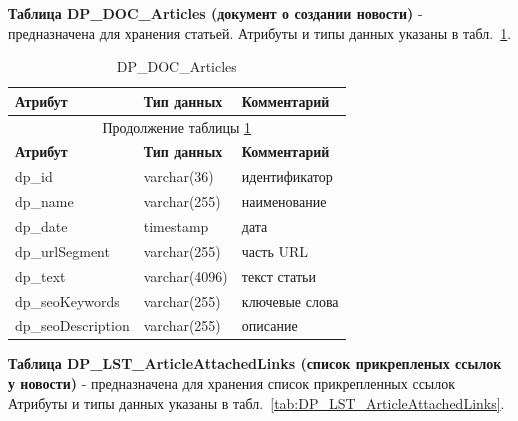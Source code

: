 \textbf{Таблица DP\_DOC\_Articles (документ о создании новости)} - предназначена для хранения статьей.
Атрибуты и типы данных указаны в табл.~\ref{tab:DP_DOC_Articles}.

\begin{longtable}{|p{5.5cm}|p{3.5cm}|p{7.5cm}|}
    \caption{DP\_DOC\_Articles} \label{tab:DP_DOC_Articles} \\
    \hline
    \textbf{Атрибут} & \textbf{Тип данных} & \textbf{Комментарий} \\ \hline
    \endfirsthead

    \multicolumn{3}{c}{Продолжение таблицы \ref{tab:DP_DOC_Articles}} \\
    \hline
    \textbf{Атрибут} & \textbf{Тип данных} & \textbf{Комментарий} \\ \hline
    \endhead

    \endfoot

    \endlastfoot
    dp\_id & varchar(36) & идентификатор \\ \hline
    dp\_name & varchar(255) & наименование \\ \hline
    dp\_date & timestamp & дата \\ \hline
    dp\_urlSegment & varchar(255) & часть URL \\ \hline
    dp\_text & varchar(4096) & текст статьи \\ \hline
    dp\_seoKeywords & varchar(255) & ключевые слова \\ \hline
    dp\_seoDescription & varchar(255) & описание \\ \hline
\end{longtable}

\textbf{Таблица DP\_LST\_ArticleAttachedLinks (список прикрепленых ссылок у новости)} - предназначена для хранения список прикрепленных ссылок
Атрибуты и типы данных указаны в табл.~\ref{tab:DP_LST_ArticleAttachedLinks}.

